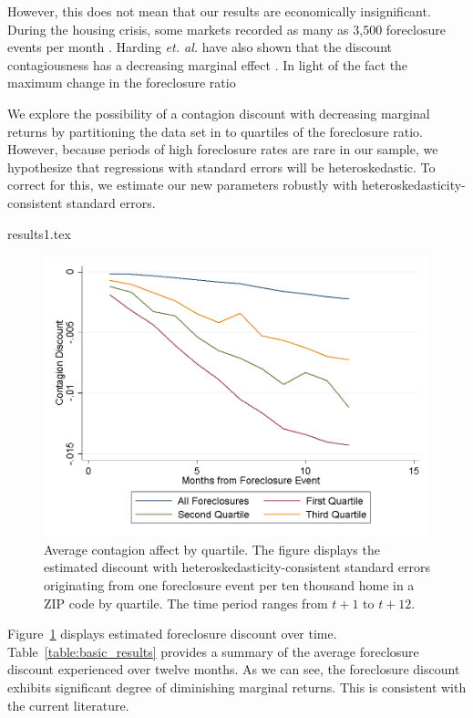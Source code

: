 \documentclass[12pt,oneside]{amsbook}
\newcommand{\et}{\textit{et. al. }}
\begin{document}
    However, this does not mean that our results are economically insignificant. During the housing crisis, some markets recorded as many as 3,500 foreclosure events per month \cite{news}. Harding \et have also shown that the discount contagiousness has a decreasing marginal effect \cite{Chi}. In light of the fact the maximum change in the foreclosure ratio 
    
    We explore the possibility of a contagion discount with decreasing marginal returns by partitioning the data set in to quartiles of the foreclosure ratio. However, because periods of high foreclosure rates are rare in our sample, we hypothesize that regressions with standard errors will be heteroskedastic. To correct for this, we estimate our new parameters robustly with heteroskedasticity-consistent standard errors.

{results1.tex}

\begin{figure}\label{graph:lin_quart}
\centering
\includegraphics[width=\textwidth]{20MSA_linquart.png}
\caption{\tiny Average contagion affect by quartile. The figure displays the estimated discount with heteroskedasticity-consistent standard errors originating from one foreclosure event per ten thousand home in a ZIP code by quartile. The time period ranges from $t+1$ to $t+12$. }
\end{figure}

Figure~\ref{graph:lin_quart} displays estimated foreclosure discount over time. Table~\ref{table:basic_results} provides a summary of the average foreclosure discount experienced over twelve months. As we can see, the foreclosure discount exhibits significant degree of diminishing marginal returns. This is consistent with the current literature. 
\end{document}
